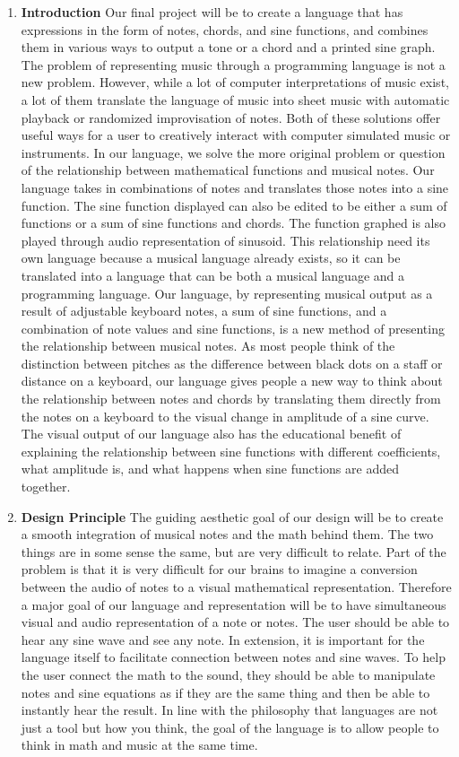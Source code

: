 \documentclass[12pt]{article}
\begin{document}
 \begin{flushleft}
\begin{enumerate}
\item
\textbf{Introduction} Our final project will be to create a language that has expressions in the form of notes, chords, and sine functions, and combines them in various ways to output a tone or a chord and a printed sine graph. The problem of representing music through a programming language is not a new problem. However, while a lot of computer interpretations of music exist, a lot of them translate the language of music into sheet music with automatic playback or randomized improvisation of notes. Both of these solutions offer useful ways for a user to creatively interact with computer simulated music or instruments. In our language, we solve the more original problem or question of the relationship between mathematical functions and musical notes. Our language takes in combinations of notes and translates those notes into a sine function. The sine function displayed can also be edited to be either a sum of functions or a sum of sine functions and chords. The function graphed is also played through audio representation of sinusoid.
This relationship need its own language because a musical language already exists, so it can be translated into a language that can be both a musical language and a programming language. Our language, by representing musical output as a result of adjustable keyboard notes, a sum of sine functions, and a combination of note values and sine functions, is a new method of presenting the relationship between musical notes. As most people think of the distinction between pitches as the difference between black dots on a staff or distance on a keyboard, our language gives people a new way to think about the relationship between notes and chords by translating them directly from the notes on a keyboard to the visual change in amplitude of a sine curve. The visual output of our language also has the educational benefit of explaining the relationship between sine functions with different coefficients, what amplitude is, and what happens when sine functions are added together. 
\item
\textbf{Design Principle}
The guiding aesthetic goal of our design will be to create a smooth integration of musical notes and the math behind them. The two things are in some sense the same, but are very difficult to relate. Part of the problem is that it is very difficult for our brains to imagine a conversion between the audio of notes to a visual mathematical representation. Therefore a major goal of our language and representation will be to have simultaneous visual and audio representation of a note or notes. The user should be able to hear any sine wave and see any note. In extension, it is important for the language itself to facilitate connection between notes and sine waves. To help the user connect the math to the sound, they should be able to manipulate notes and sine equations as if they are the same thing and then be able to instantly hear the result. In line with the philosophy that languages are not just a tool but how you think, the goal of the language is to allow people to think in math and music at the same time.

\end{enumerate}
\end{flushleft}
\end{document}
